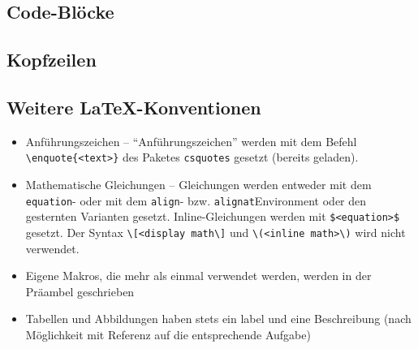 \documentclass[
    titleprefix=AlgoTeX,
    inlineshortcut=java,
    corporatedesign,
    boxarc,
]{algoexercise}
\begin{document}
    \subsection{Code-Blöcke}
    \subsection{Kopfzeilen}
    \subsection{Weitere \LaTeX-Konventionen}
    \begin{itemize}
        \item Anführungszeichen -- \enquote{Anführungszeichen} werden mit dem Befehl \verb+\enquote{<text>}+ des Paketes
            \verb+csquotes+ gesetzt (bereits geladen).
        \item Mathematische Gleichungen -- Gleichungen werden entweder mit dem \verb+equation+- oder mit dem \verb+align+- bzw.
            \verb+alignat+Environment oder den gesternten Varianten gesetzt.
            Inline-Gleichungen werden mit \verb+$<equation>$+ gesetzt.
            Der Syntax \verb+\[<display math\]+ und \verb+\(<inline math>\)+ wird nicht verwendet.
        \item Eigene Makros, die mehr als einmal verwendet werden, werden in der Präambel geschrieben
        \item Tabellen und Abbildungen haben stets ein label und eine Beschreibung (nach Möglichkeit mit Referenz auf die
            entsprechende Aufgabe)
    \end{itemize}
    \clearpage{}
\end{document}
